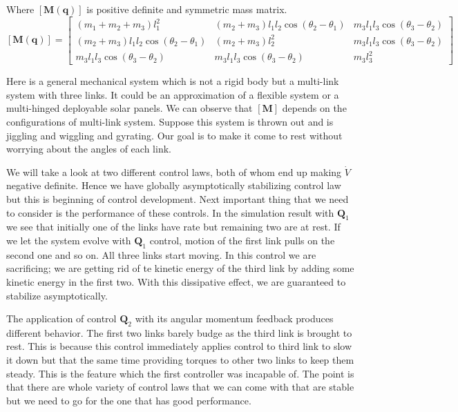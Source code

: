 \documentclass{article}
\begin{document}
Where $[\bm{M}(\bm{q})]$ is positive definite and symmetric mass matrix.
$$
[\bm{M}(\bm{q})]=
\begin{bmatrix}
  (m_{1}+m_{2}+m_{3})l^{2}_{1} & (m_{2}+m_{3})l_{1}l_{2}\cos{(\theta_{2}-\theta_{1})} & m_{3}l_{1}l_{3}\cos{(\theta_{3}-\theta_{2})}\\
  (m_{2}+m_{3})l_{1}l_{2}\cos{(\theta_{2}-\theta_{1})} & (m_{2}+m_{3})l^{2}_{2} & m_{3}l_{1}l_{3}\cos{(\theta_{3}-\theta_{2})}\\
  m_{3}l_{1}l_{3}\cos{(\theta_{3}-\theta_{2})} & m_{3}l_{1}l_{3}\cos{(\theta_{3}-\theta_{2})} & m_{3}l^{2}_{3}
\end{bmatrix}
$$

Here is a general mechanical system which is not a rigid body but a multi-link system with three links. It could be an approximation of a flexible system or a multi-hinged deployable solar panels. We can observe that $[\bm{M}]$ depends on the configurations of multi-link system. Suppose this system is thrown out and is jiggling and wiggling and gyrating. Our goal is to make it come to rest without worrying about the angles of each link.

We will take a look at two different control laws, both of whom end up making $\dot{V}$ negative definite. Hence we have globally asymptotically stabilizing control law but this is beginning of control development. Next important thing that we need to consider is the performance of these controls. In the simulation result with $\bm{Q}_{1}$ we see that initially one of the links have rate but remaining two are at rest. If we let the system evolve with $\bm{Q}_{1}$ control, motion of the first link pulls on the second one and so on. All three links start moving. In this control we are sacrificing; we are getting rid of te kinetic energy of the third link by adding some kinetic energy in the first two. With this dissipative effect, we are guaranteed to stabilize asymptotically.

The application of control $\bm{Q}_{2}$ with its angular momentum feedback produces different behavior. The first two links barely budge as the third link is brought to rest. This is because this control immediately applies control to third link to slow it down but that the same time providing torques to other two links to keep them steady. This is the feature which the first controller was incapable of. The point is that there are whole variety of control laws that we can come with that are stable but we need to go for the one that has good performance.
\end{document}
